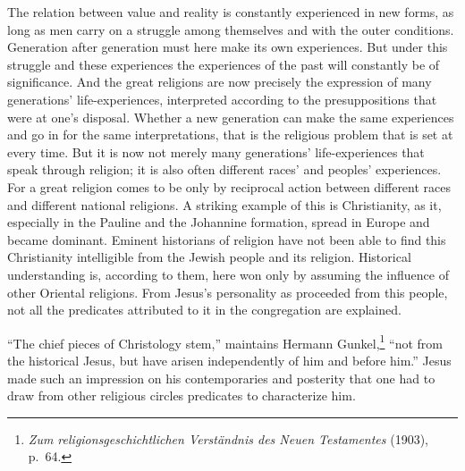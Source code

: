 \documentclass[12pt]{book}
\newcommand{\opage}[1]{\marginnote{\footnotesize\textit{[#1]}}}
\begin{document}
The relation between value and reality is constantly experienced in new forms, as long as men carry on a
struggle among themselves and with the outer conditions. Generation after generation must here make its own
experiences. But under this struggle and these experiences the experiences of the past will constantly be of
significance. And the great religions are now precisely the expression of many generations' life-experiences,
interpreted according to the presuppositions that were at one's disposal. Whether a new generation can make
the same experiences and go in for the same interpretations, that is the religious problem that is set at
every time. But it is now not merely many generations' life-experiences that speak through religion; it is
also often different races' and peoples' experiences. For a great religion comes to be only by reciprocal
action between different races and different national religions. A striking example of this is Christianity, as
it, especially in the Pauline and the Johannine formation, spread in Europe and became dominant. Eminent
historians of religion have not been able to find this Christianity intelligible from the Jewish people and
its religion. Historical understanding is, according to them, here won only by assuming the influence of other
Oriental religions. From Jesus's personality as proceeded from this people, not all the predicates attributed
to it in the congregation are explained.

``The chief pieces of Christology stem,'' maintains Hermann \opage{113}Gunkel,\footnote{\textit{Zum
religionsgeschichtlichen Verständnis des Neuen Testamentes} (1903), p.\ 64.} ``not from the historical Jesus,
but have arisen independently of him and before him.'' Jesus made such an impression on his contemporaries and
posterity that one had to draw from other religious circles predicates to characterize him.
\end{document}
